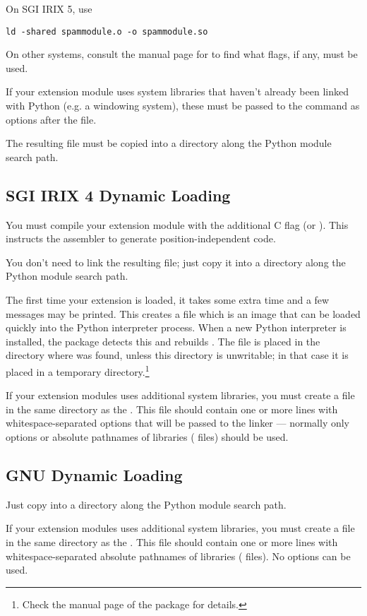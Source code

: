 \documentclass{manual}
\begin{document}
On SGI IRIX 5, use
\begin{verbatim}
ld -shared spammodule.o -o spammodule.so
\end{verbatim}

On other systems, consult the manual page for  to find
what flags, if any, must be used.

If your extension module uses system libraries that haven't already
been linked with Python (e.g. a windowing system), these must be
passed to the  command as  options after the
 file.

The resulting file  must be copied into a directory
along the Python module search path.


\subsection{SGI IRIX 4 Dynamic Loading
            \label{irixLinking}}

 You must compile your extension module with the
additional C flag  (or ).  This instructs the
assembler to generate position-independent code.

You don't need to link the resulting  file; just
copy it into a directory along the Python module search path.%

The first time your extension is loaded, it takes some extra time and
a few messages may be printed.  This creates a file
 which is an image that can be loaded quickly into
the Python interpreter process.  When a new Python interpreter is
installed, the  package detects this and rebuilds
.  The file  is placed in the
directory where  was found, unless this directory is
unwritable; in that case it is placed in a temporary
directory.\footnote{Check the manual page of the  package for
details.}

If your extension modules uses additional system libraries, you must
create a file  in the same directory as the
.  This file should contain one or more lines with
whitespace-separated options that will be passed to the linker ---
normally only  options or absolute pathnames of libraries
( files) should be used.


\subsection{GNU Dynamic Loading
            \label{gnuLinking}}

Just copy  into a directory along the Python module
search path.%

If your extension modules uses additional system libraries, you must
create a file  in the same directory as the
.  This file should contain one or more lines with
whitespace-separated absolute pathnames of libraries (
files).  No  options can be used.
\end{document}
